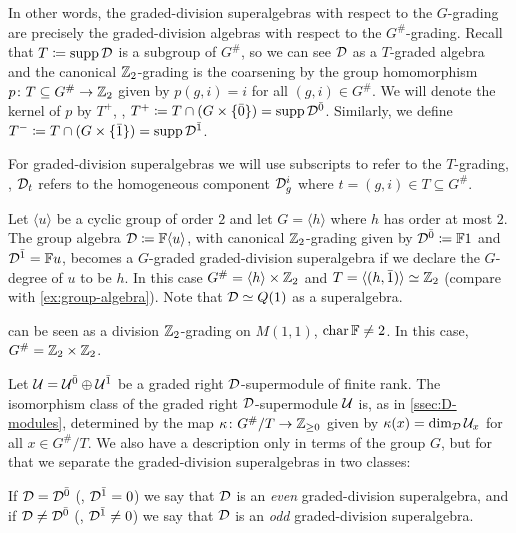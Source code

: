 In other words, the graded-division superalgebras with respect to the $G$-grading are precisely the graded-division algebras with respect to the $G^\#$-grading. 
Recall that $T \coloneqq \operatorname{supp} \mathcal{D}$ is a subgroup of $G^\#$, so we can see $\mathcal{D}$ as a $T$-graded algebra and the canonical $\mathbb{Z}_2$-grading is the coarsening by the group homomorphism $p\colon T \subseteq G^\# \to \mathbb{Z}_2$ given by $p (g, i) = i$ for all $(g,i)\in G^\#$. 
We will denote the kernel of $p$ by $T^+$, \ie, $T^+ \coloneqq T\cap (G\times \{ \bar 0 \}) = \operatorname{supp} \mathcal{D}^{\bar0}$. 
Similarly, we define $T^- \coloneqq T\cap (G\times \{ \bar 1 \}) =  \operatorname{supp} \mathcal{D}^{\bar1}$. 

\begin{notation}
    For graded-division superalgebras we will use subscripts to refer to the $T$-grading, \ie, $\mathcal{D}_t$ refers to the homogeneous component $\mathcal{D}_g^i$ where $t = (g, i) \in T \subseteq G^\#$. 
\end{notation}

\begin{ex}\label{ex:Q(1)-as-grd-div-SA}
    Let $\langle u \rangle$ be a cyclic group of order $2$ and let $G = \langle h \rangle$ where $h$ has order at most $2$.  
    The group algebra $\mathcal{D} \coloneqq \mathbb{F}\langle u \rangle$, with canonical $\mathbb{Z}_2$-grading given by $\mathcal{D}^{\bar0} \coloneqq \mathbb{F} 1$ and $\mathcal{D}^{\bar1} = \mathbb{F} u$, becomes a $G$-graded graded-division superalgebra if we declare the $G$-degree of $u$ to be $h$. 
    In this case $G^\# = \langle h \rangle \times \mathbb{Z}_2$ and $T = \langle (h, \bar 1) \rangle \simeq \mathbb{Z}_2$ 
    (compare with \cref{ex:group-algebra}). 
    Note that $\mathcal{D} \simeq Q(1)$ as a superalgebra.
\end{ex}

\begin{ex}\label{ex:Pauli-2x2-super}
     can be seen as a division $\mathbb{Z}_2$-grading on $M(1,1)$, $\operatorname{char} \mathbb{F} \neq 2$. 
    In this case, $G^\# = \mathbb{Z}_2 \times \mathbb{Z}_2$.
\end{ex}

Let $\mathcal U = \mathcal U^{\bar0} \oplus \mathcal U^{\bar1}$ be a graded right $\mathcal{D}$-supermodule of finite rank. 
The isomorphism class of the graded right $\mathcal{D}$-supermodule $\mathcal U$ is, as in \cref{ssec:D-modules}, determined by the map $\kappa\colon G^\#/T \to \mathbb{Z}_{\geq 0}$ given by $\kappa (x) = \dim_{\mathcal{D}} \mathcal U_x$ for all $x\in G^\#/T$. 
We also have a description only in terms of the group $G$, but for that we separate the graded-division superalgebras in two classes:

\begin{defi}\label{defi:even-odd-D}
    If $\mathcal{D} = \mathcal{D}^{\bar0}$ (\ie, $\mathcal{D}^{\bar1} = 0$) we say that $\mathcal{D}$ is an \emph{even} graded-division superalgebra, and if $\mathcal{D} \neq \mathcal{D}^{\bar0}$ (\ie, $\mathcal{D}^{\bar1} \neq 0$) we say that $\mathcal{D}$ is an \emph{odd} graded-division superalgebra. 
\end{defi}

